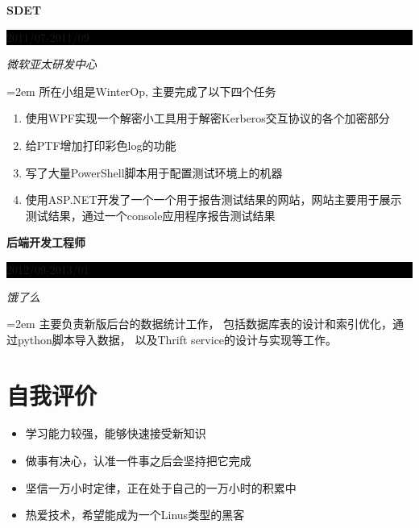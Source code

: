 \documentclass[paper=a4,fontsize=11pt]{scrartcl}	 			%
\newcommand{\sepspace}{\vspace*{1em}}			%
\newcommand{\NewPart}[1]{\section*{\uppercase{#1}}}
\newcommand{\EducationEntry}[4]{
		\noindent \textbf{#1} \hfill 					%
		\colorbox{Black}{%
			\parbox{8em}{%
			\hfill\color{White}#2}} \par				%
		\noindent \textit{#3} \par					%
		\noindent\hangindent=2em\hangafter=0  #4 	%
		\normalsize \par}
\begin{document}
\begin{CJK}{UTF8}{gbsn}
\EducationEntry{SDET}{2011/07-2011/09}{微软亚太研发中心}
{所在小组是WinterOp, 主要完成了以下四个任务
\begin{enumerate}
        \item 使用WPF实现一个解密小工具用于解密Kerberos交互协议的各个加密部分
        \item 给PTF增加打印彩色log的功能
        \item 写了大量PowerShell脚本用于配置测试环境上的机器
        \item 使用ASP.NET开发了一个一个用于报告测试结果的网站，网站主要用于展示测试结果，通过一个console应用程序报告测试结果
\end{enumerate}
}
\sepspace

\EducationEntry{后端开发工程师}{2012/09-2013/01}{饿了么}
{主要负责新版后台的数据统计工作，
包括数据库表的设计和索引优化，通过python脚本导入数据，
以及Thrift service的设计与实现等工作。
}

\NewPart{自我评价}{}
\begin{itemize}
\item 学习能力较强，能够快速接受新知识
\item 做事有决心，认准一件事之后会坚持把它完成
\item 坚信一万小时定律，正在处于自己的一万小时的积累中
\item 热爱技术，希望能成为一个Linus类型的黑客
\end{itemize}
\end{CJK}
\end{document}
